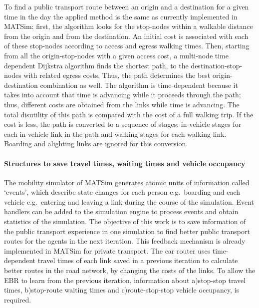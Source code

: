 To find a public transport route between an origin and a destination for a given time in the day the applied method is the same as currently implemented in MATSim: first, the algorithm looks for the stop-nodes within a walkable distance from the origin and from the destination. An initial cost is associated with each of these stop-nodes according to access and egress walking times. Then, starting from all the origin-stop-nodes with a given access cost, a multi-node time dependent Dijkstra algorithm finds the shortest path, to the destination-stop-nodes with related egress costs. Thus, the path determines the best origin-destination combination as well. The algorithm is time-dependent because it takes into account that time is advancing while it proceeds through the path; thus, different costs are obtained from the links while time is advancing. The total disutility of this path is compared with the cost of a full walking trip. If the cost is less, the path is converted to a sequence of stages: in-vehicle stages for each in-vehicle link in the path and walking stages for each walking link. Boarding and alighting links are ignored for this conversion.

\paragraph{Structures to save travel times, waiting times and vehicle occupancy} \label{subsec:Structures}

The mobility simulator of MATSim generates atomic units of information called `events', which describe state changes for each person e.g.\ boarding and each vehicle e.g.\ entering and leaving a link during the course of the simulation. Event handlers can be added to the simulation engine to process events and obtain statistics of the simulation. The objective of this work is to save information of the public transport experience in one simulation to find better public transport routes for the agents in the next iteration. This feedback mechanism is already implemented in MATSim for private transport. The car router uses time-dependent travel times of each link saved in a previous iteration to calculate better routes in the road network, by changing the costs of the links. To allow the EBR to learn from the previous iteration, information about a)stop-stop travel times, b)stop-route waiting times and c)route-stop-stop vehicle occupancy, is required.

